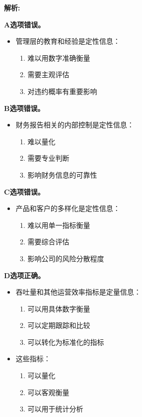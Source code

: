 \documentclass{article}
\newenvironment{explanation}
{\textbf{解析:}\par}
{\par}
\begin{document}
\begin{explanation}
    \textbf{A选项错误。}
    \begin{itemize}
        \item 管理层的教育和经验是定性信息：
        \begin{enumerate}
            \item 难以用数字准确衡量
            \item 需要主观评估
            \item 对违约概率有重要影响
        \end{enumerate}
    \end{itemize}
    
    \textbf{B选项错误。}
    \begin{itemize}
        \item 财务报告相关的内部控制是定性信息：
        \begin{enumerate}
            \item 难以量化
            \item 需要专业判断
            \item 影响财务信息的可靠性
        \end{enumerate}
    \end{itemize}
    
    \textbf{C选项错误。}
    \begin{itemize}
        \item 产品和客户的多样化是定性信息：
        \begin{enumerate}
            \item 难以用单一指标衡量
            \item 需要综合评估
            \item 影响公司的风险分散程度
        \end{enumerate}
    \end{itemize}
    
    \textbf{D选项正确。}
    \begin{itemize}
        \item 吞吐量和其他运营效率指标是定量信息：
        \begin{enumerate}
            \item 可以用具体数字衡量
            \item 可以定期跟踪和比较
            \item 可以转化为标准化的指标
        \end{enumerate}
        \item 这些指标：
        \begin{enumerate}
            \item 可以量化
            \item 可以客观衡量
            \item 可以用于统计分析
        \end{enumerate}
    \end{itemize}
\end{explanation}
\end{document}
